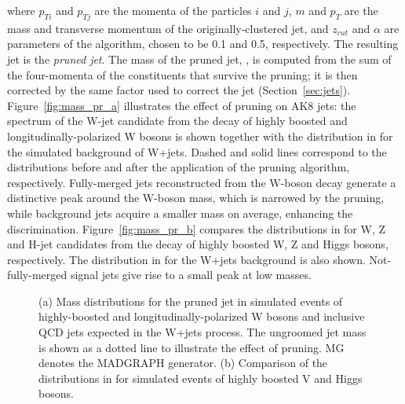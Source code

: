 \noindent where $p_{Ti}$ and $p_{Tj}$ are the momenta of the particles $i$ and $j$, $m$ and $p_T$ are the mass and transverse momentum of the originally-clustered jet, and $z_{cut}$ and $\alpha$ are parameters of the algorithm, chosen to be 0.1 and 0.5, respectively. 
The resulting jet is the \emph{pruned jet}. The mass of the pruned jet, \mJ, is computed from the sum of the four-momenta of the constituents that survive the pruning; it is then corrected by the same factor used to correct the jet \pt (Section~\ref{sec:jets}).
Figure~\ref{fig:mass_pr_a} illustrates the effect of pruning on AK8 jets: the \mJ spectrum of the W-jet candidate from the decay of highly boosted and longitudinally-polarized W bosons is shown together with the distribution in \mJ for the simulated background of W+jets. Dashed and solid lines correspond to the distributions before and after the application of the pruning algorithm, respectively. Fully-merged jets reconstructed from the W-boson decay generate a distinctive peak around the W-boson mass, which is narrowed by the pruning, while background jets acquire a smaller mass on average, enhancing the discrimination. Figure~\ref{fig:mass_pr_b} compares the distributions in \mJ for W, Z and H-jet candidates from the decay of highly boosted W, Z and Higgs bosons, respectively. The distribution in \mJ for the W+jets background is also shown. Not-fully-merged signal jets give rise to a small peak at low masses. 

\begin{figure}[!htb]
\centering     %
{}
\caption{(a) Mass distributions for the pruned jet in simulated events of highly-boosted and longitudinally-polarized W bosons and inclusive QCD jets expected in the W+jets process. The ungroomed jet mass is shown as a dotted line to illustrate the effect of pruning. MG denotes the MADGRAPH generator. (b) Comparison of the distributions in \mJ for simulated events of highly boosted V and Higgs bosons.}
\label{fig:mass_pr}
\end{figure}
 
